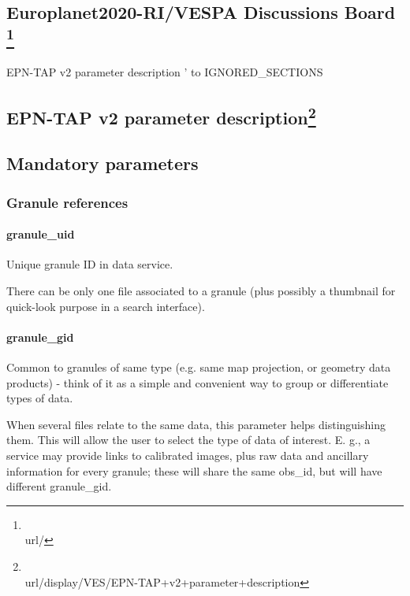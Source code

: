 \documentclass[11pt,a4paper]{ivoa}
\begin{document}




\subsection{Europlanet2020-RI/VESPA Discussions Board \footnote{\\url{/}}}

EPN-TAP v2 parameter description
' to IGNORED_SECTIONS
\subsection{
EPN-TAP v2 parameter description\footnote{\\url{/display/VES/EPN-TAP+v2+parameter+description}}
}

\subsection{Mandatory parameters}

\subsubsection{Granule references}

\paragraph{granule\_uid}

Unique granule ID in data service.

There can be only one file associated to a granule (plus possibly a thumbnail for quick-look purpose in a search interface).

\paragraph{granule\_gid}

Common to granules of same type (e.g. same map projection, or geometry data products) - think of it as a simple and convenient way to group or differentiate types of data.

When several files relate to the same data, this parameter helps distinguishing them. This will allow the user to select the type of data of interest. E. g., a service may provide links to calibrated images, plus raw data and ancillary information for every granule; these will share the same obs\_id, but will have different granule\_gid.
\end{document}

